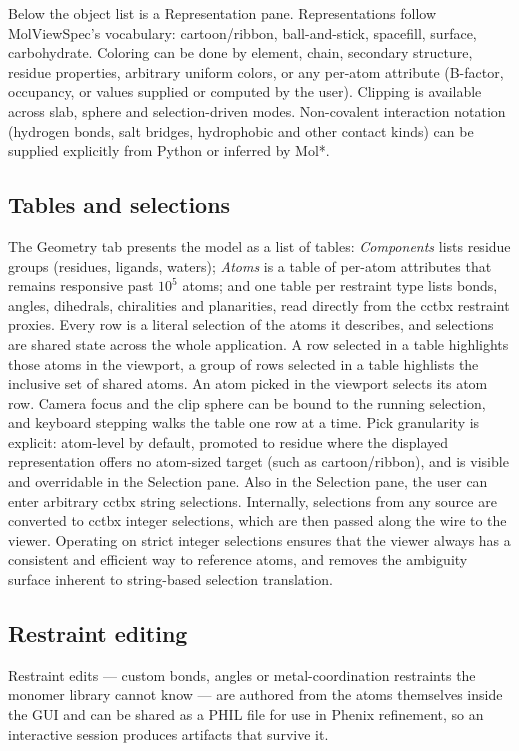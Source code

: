 \documentclass[11pt]{article}
\begin{document}
Below the object list is a Representation pane. Representations follow
MolViewSpec's vocabulary: cartoon/ribbon, ball-and-stick, spacefill,
surface, carbohydrate. Coloring can be done by element, chain, secondary
structure, residue properties, arbitrary uniform colors, or any per-atom
attribute (B-factor, occupancy, or values supplied or computed by the user). Clipping is available across slab, sphere and
selection-driven modes.  Non-covalent
interaction notation (hydrogen bonds, salt bridges, hydrophobic and other
contact kinds) can be supplied explicitly from Python or inferred by Mol*.

\subsection{Tables and selections}

The Geometry tab presents the model as a list of tables: \emph{Components} lists residue groups (residues, ligands, waters);
\emph{Atoms} is a table of per-atom attributes that remains
responsive past $10^5$ atoms; and one table per restraint type
lists bonds, angles, dihedrals, chiralities and planarities, read directly
from the cctbx restraint proxies. Every row is a literal selection of the
atoms it describes, and selections are shared state across the whole
application. A row selected in a table highlights those atoms in the
viewport, a group of rows selected in a table highlists the inclusive set of shared atoms. An atom picked in the viewport selects its atom row. Camera focus and
the clip sphere can be bound to the running selection, and keyboard stepping
walks the table one row at a time. Pick granularity is
explicit: atom-level by default, promoted to residue where the displayed
representation offers no atom-sized target (such as cartoon/ribbon), and is visible and
overridable in the Selection pane. Also in the Selection pane, the user can enter arbitrary cctbx string selections.
Internally, selections from any source are converted to cctbx integer selections, which are then passed along the wire to the viewer.
Operating on strict integer selections ensures that the viewer always has a consistent and efficient way to reference atoms, 
and removes the ambiguity surface inherent to string-based selection translation.

\subsection{Restraint editing}
Restraint edits --- custom bonds, angles or
metal-coordination restraints the monomer library cannot know --- are
authored from the atoms themselves inside the GUI and can be shared as a
PHIL file for use in Phenix refinement, so an interactive session produces
artifacts that survive it.
\end{document}
